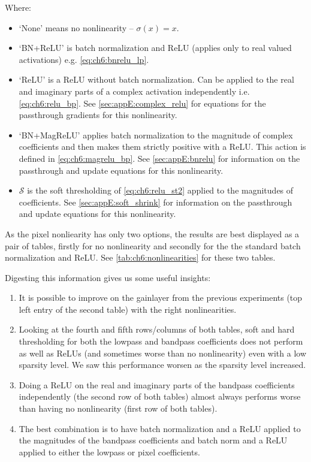 Where:
\begin{itemize}
  \item `None' means no nonlinearity -- $\sigma(x) = x$.
  \item `BN+ReLU' is batch normalization and ReLU (applies only to real valued
    activations) e.g. \eqref{eq:ch6:bnrelu_lp}.
  \item `ReLU' is a ReLU without batch normalization. Can be applied to the real
    and imaginary parts of a complex activation independently i.e.
    \eqref{eq:ch6:relu_bp}. See \autoref{sec:appE:complex_relu} for equations
    for the passthrough gradients for this nonlinearity.
  \item `BN+MagReLU' applies batch normalization to the magnitude of complex
    coefficients and then makes them strictly positive with a ReLU. This action
    is defined in \eqref{eq:ch6:magrelu_bp}. See \autoref{sec:appE:bnrelu} for
    information on the passthrough and update equations for this nonlinearity.
  \item $\mathcal{S}$ is the soft thresholding of \eqref{eq:ch6:relu_st2}
    applied to the magnitudes of coefficients.  See
    \autoref{sec:appE:soft_shrink} for information on the passthrough and update
    equations for this nonlinearity.
\end{itemize}

As the pixel nonliearity has only two options, the results are best displayed as
a pair of tables, firstly for no nonlinearity and secondly for the
the standard batch normalization and ReLU. See
\autoref{tab:ch6:nonlinearities} for these two tables. 

Digesting this information gives us some useful insights: 
\begin{enumerate}
  \item It is possible to improve on the gainlayer from the previous experiments
    (top left entry of the second table) with the right nonlinearities.
  \item Looking at the fourth and fifth rows/columns of both tables, soft and
    hard thresholding for both the lowpass and bandpass coefficients does not perform as
    well as ReLUs (and sometimes worse than no nonlinearity) even with a low
    sparsity level. We saw this performance worsen as the sparsity level
    increased.
  \item Doing a ReLU on the real and imaginary parts of the bandpass
    coefficients independently (the second row of both tables) almost always
    performs worse than having no nonlinearity (first row of both tables).
  \item The best combination is to have batch normalization and a ReLU applied
    to the magnitudes of the bandpass coefficients and batch norm and a ReLU
    applied to either the lowpass or pixel coefficients. 
\end{enumerate}


